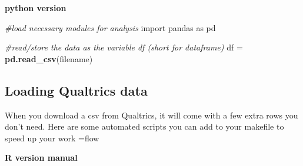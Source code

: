 \documentclass[]{book}
\newenvironment{Shaded}{\begin{snugshade}}{\end{snugshade}}
\newcommand{\KeywordTok}[1]{\textcolor[rgb]{0.13,0.29,0.53}{\textbf{#1}}}
\newcommand{\DataTypeTok}[1]{\textcolor[rgb]{0.13,0.29,0.53}{#1}}
\newcommand{\DecValTok}[1]{\textcolor[rgb]{0.00,0.00,0.81}{#1}}
\newcommand{\StringTok}[1]{\textcolor[rgb]{0.31,0.60,0.02}{#1}}
\newcommand{\CommentTok}[1]{\textcolor[rgb]{0.56,0.35,0.01}{\textit{#1}}}
\newcommand{\OperatorTok}[1]{\textcolor[rgb]{0.81,0.36,0.00}{\textbf{#1}}}
\newcommand{\NormalTok}[1]{#1}
\begin{document}
\textbf{python version}

\begin{Shaded}
\begin{Highlighting}[]
\CommentTok{#load necessary modules for analysis}
\NormalTok{import pandas as pd}

\CommentTok{#read/store the data as the variable df (short for dataframe)}
\NormalTok{df =}\StringTok{ }\KeywordTok{pd.read_csv}\NormalTok{(filename)}
\end{Highlighting}
\end{Shaded}

\subsection{Loading Qualtrics data}\label{loading-qualtrics-data}

When you download a csv from Qualtrics, it will come with a few extra
rows you don't need. Here are some automated scripts you can add to your
makefile to speed up your work =flow

\textbf{R version manual}

\begin{Shaded}
\end{Shaded}
\end{document}
